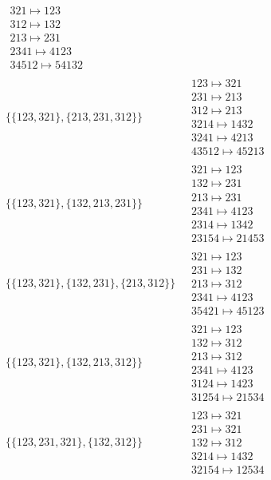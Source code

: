 \begin{scriptsize}
\begin{align}
\begin{matrix}
321 \mapsto 123\\312 \mapsto 132\\213 \mapsto 231\\2341 \mapsto 4123\\34512 \mapsto 54132
\end{matrix}
\\
\{\{123, 321\}, \{213, 231, 312\}\}
\ 
&
\begin{matrix}
123 \mapsto 321\\231 \mapsto 213\\312 \mapsto 213\\3214 \mapsto 1432\\3241 \mapsto 4213\\43512 \mapsto 45213
\end{matrix}
\\
\{\{123, 321\}, \{132, 213, 231\}\}
\ 
&
\begin{matrix}
321 \mapsto 123\\132 \mapsto 231\\213 \mapsto 231\\2341 \mapsto 4123\\2314 \mapsto 1342\\23154 \mapsto 21453
\end{matrix}
\\
\{\{123, 321\}, \{132, 231\}, \{213, 312\}\}
\ 
&
\begin{matrix}
321 \mapsto 123\\231 \mapsto 132\\213 \mapsto 312\\2341 \mapsto 4123\\35421 \mapsto 45123
\end{matrix}
\\
\{\{123, 321\}, \{132, 213, 312\}\}
\ 
&
\begin{matrix}
321 \mapsto 123\\132 \mapsto 312\\213 \mapsto 312\\2341 \mapsto 4123\\3124 \mapsto 1423\\31254 \mapsto 21534
\end{matrix}
\\
\{\{123, 231, 321\}, \{132, 312\}\}
\ 
&
\begin{matrix}
123 \mapsto 321\\231 \mapsto 321\\132 \mapsto 312\\3214 \mapsto 1432\\32154 \mapsto 12534

\end{matrix}
\end{align}
\end{scriptsize}
